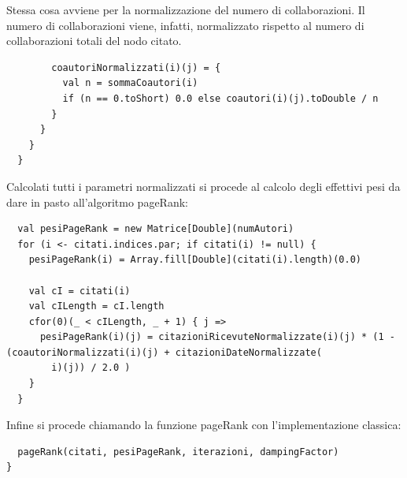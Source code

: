 \documentclass[a4paper, 12pt]{article}
\begin{document}
Stessa cosa avviene per la normalizzazione del numero di collaborazioni. Il numero di collaborazioni viene, infatti, normalizzato rispetto al numero di collaborazioni totali del nodo citato.
\begin{lstlisting} 
        coautoriNormalizzati(i)(j) = {
          val n = sommaCoautori(i)
          if (n == 0.toShort) 0.0 else coautori(i)(j).toDouble / n
        }
      }
    }
  }
\end{lstlisting}
Calcolati tutti i parametri normalizzati si procede al calcolo degli effettivi pesi da dare in pasto all'algoritmo pageRank:
\begin{lstlisting}
  val pesiPageRank = new Matrice[Double](numAutori)
  for (i <- citati.indices.par; if citati(i) != null) {
    pesiPageRank(i) = Array.fill[Double](citati(i).length)(0.0)

    val cI = citati(i)
    val cILength = cI.length
    cfor(0)(_ < cILength, _ + 1) { j =>
      pesiPageRank(i)(j) = citazioniRicevuteNormalizzate(i)(j) * (1 - (coautoriNormalizzati(i)(j) + citazioniDateNormalizzate(
        i)(j)) / 2.0 )
    }
  }
\end{lstlisting}
Infine si procede chiamando la funzione pageRank con l'implementazione classica:
\begin{lstlisting}
  pageRank(citati, pesiPageRank, iterazioni, dampingFactor)
}
\end{lstlisting}
\end{document}
